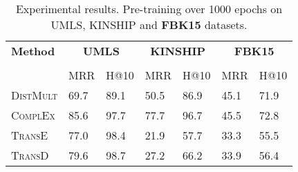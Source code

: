 \begin{table}[H]
    \centering
    \begin{tabular}{lllllll}
        \toprule
        \textbf{Method} &
        \multicolumn{2}{c}{\textbf{UMLS}} & 
        \multicolumn{2}{c}{\textbf{KINSHIP}} & 
        \multicolumn{2}{c}{\textbf{FBK15}}\\
        
        \cmidrule{2-6} \cmidrule{7-7} \\
        {} & MRR & H@10 & MRR & H@10 & MRR & H@10 \\
        
        \midrule

        \textsc{DistMult}  
        & 69.7 & 89.1 & 50.5 & 86.9 & 45.1 & 71.9\\
        
        \textsc{ComplEx}   
        & 85.6 & 97.7 & 77.7 & 96.7 & 45.5 & 72.8\\
        
        \textsc{TransE}    
        & 77.0 & 98.4 & 21.9 & 57.7 & 33.3 & 55.5 \\
        
        \textsc{TransD}    
        & 79.6 & 98.7 & 27.2 & 66.2 & 33.9 & 56.4 \\ 
        \bottomrule
    \end{tabular}
    \caption{Experimental results.
    Pre-training over 1000 epochs on \textsc{UMLS},
  \textsc{KINSHIP} and \textbf{FBK15} datasets.}
    \label{tab:result_table1_pretraining}
\end{table}



